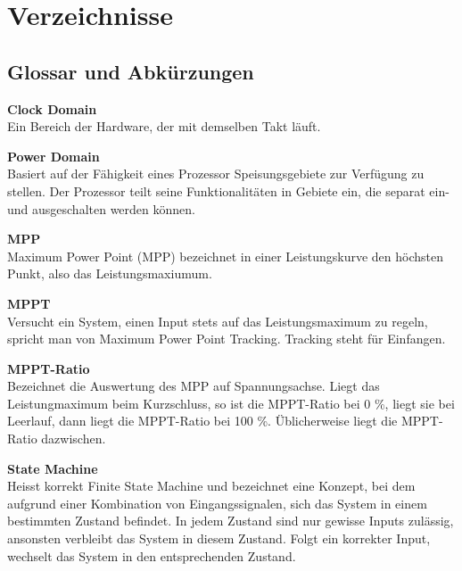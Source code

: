 \chapter{Verzeichnisse}




\renewcommand{\bibsection}{\section{\refname}}  %
\makeatletter
\makeatother






\section{Glossar und Abkürzungen}\label{glossar}

\textbf{Clock Domain}\\
\forceindent Ein Bereich der Hardware, der mit demselben Takt läuft.

\textbf{Power Domain}\\
\forceindent Basiert auf der Fähigkeit eines Prozessor Speisungsgebiete zur Verfügung zu stellen. Der Prozessor teilt seine Funktionalitäten in Gebiete ein, die separat ein- und ausgeschalten werden können.

\textbf{MPP}\\
\forceindent Maximum Power Point (MPP) bezeichnet in einer Leistungskurve den höchsten Punkt, also das Leistungsmaxiumum.

\textbf{MPPT}\\
\forceindent Versucht ein System, einen Input stets auf das Leistungsmaximum zu regeln, spricht man von Maximum Power Point Tracking. Tracking steht für Einfangen.

\textbf{MPPT-Ratio}\\
\forceindent Bezeichnet die Auswertung des MPP auf Spannungsachse. Liegt das Leistungmaximum beim Kurzschluss, so ist die MPPT-Ratio bei 0 \%, liegt sie bei Leerlauf, dann liegt die MPPT-Ratio bei 100 \%. Üblicherweise liegt die MPPT-Ratio dazwischen.

\textbf{State Machine}\\
\forceindent Heisst korrekt Finite State Machine und bezeichnet eine Konzept, bei dem aufgrund einer Kombination von Eingangssignalen, sich das System in einem bestimmten Zustand befindet. In jedem Zustand sind nur gewisse Inputs zulässig, ansonsten verbleibt das System in diesem Zustand. Folgt ein korrekter Input, wechselt das System in den entsprechenden Zustand. 

